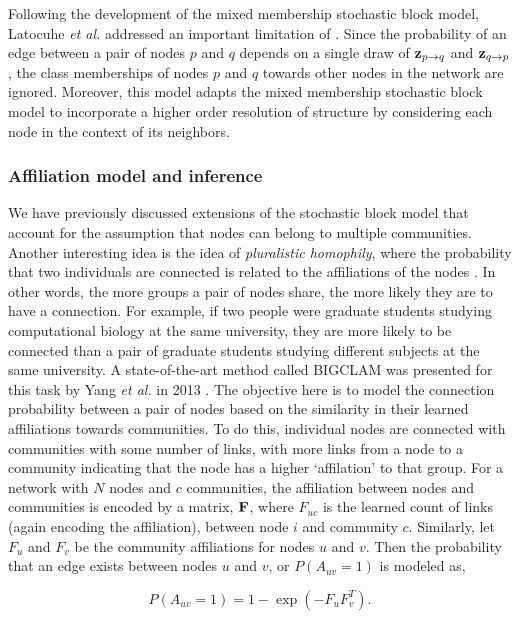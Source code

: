 Following the development of the mixed membership stochastic block model, Latocuhe \emph{et al.} \cite{LA} addressed an important limitation of \cite{mixMember}. Since the probability of an edge between a pair of nodes $p$ and $q$ depends on a single draw of ${\bf z}_{p\rightarrow q}$ and ${\bf z}_{q\rightarrow p}$, the class memberships of nodes $p$ and $q$ towards other nodes in the network are ignored. Moreover, this model adapts the mixed membership stochastic block model to incorporate a higher order resolution of structure by considering each node in the context of its neighbors. 

\subsubsection{Affiliation model and inference}

We have previously discussed extensions of the stochastic block model that account for the assumption that nodes can belong to multiple communities. Another interesting idea is the idea of \emph{pluralistic homophily}, where the probability that two individuals are connected is related to the affiliations of the nodes \cite{pluralHom}. In other words, the more groups a pair of nodes share, the more likely they are to have a connection. For example, if two people were graduate students studying computational biology at the same university, they are more likely to be connected than a pair of graduate students studying different subjects at the same university. A state-of-the-art method called BIGCLAM was presented for this task by Yang \emph{et al.} in 2013 \cite{bigclam}. The objective here is to model the connection probability between a pair of nodes based on the similarity in their learned affiliations towards communities. To do this, individual nodes are connected with communities with some number of links, with more links from a node to a community indicating that the node has a higher `affilation' to that group. For a network with $N$ nodes and $c$ communities, the affiliation between nodes and communities is encoded by a matrix, ${\bf F}$, where $F_{uc}$ is the learned count of links (again encoding the affiliation), between node $i$ and community $c$. Similarly, let $F_{u}$ and $F_{v}$ be the community affiliations for nodes $u$ and $v$. Then the probability that an edge exists between nodes $u$ and $v$, or $P(A_{uv}=1)$ is modeled as, 

\begin{equation}
P(A_{uv}=1)=1-\exp(-F_{u}F_{v}^{T}).
\label{eqAff}
\end{equation}

